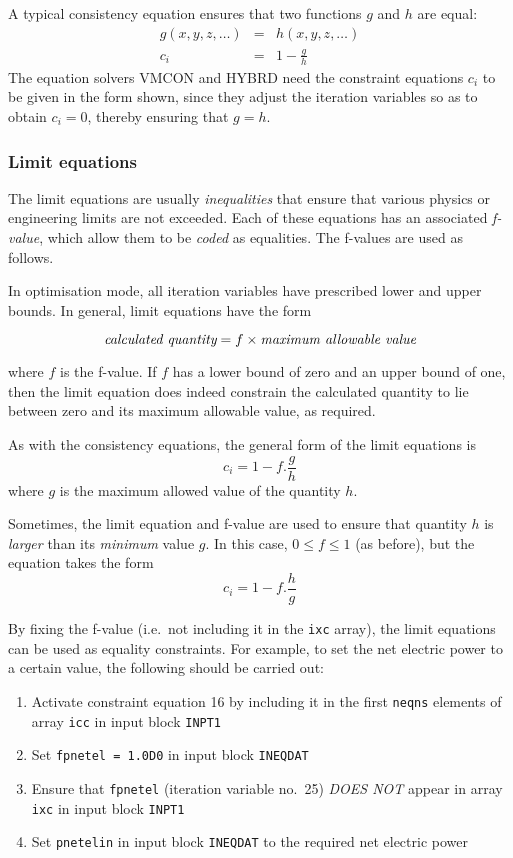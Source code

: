 \documentclass[11pt,a4paper]{report}
\begin{document}
A typical consistency equation ensures that two functions $g$ and $h$ are
equal:
\begin{eqnarray*}
g(x,y,z,\ldots) & = & h(x,y,z,\ldots) \\
c_i & = & 1 - \frac{g}{h}
\end{eqnarray*}
The equation solvers VMCON and HYBRD need the constraint equations $c_i$ to be
given in the form shown, since they adjust the iteration variables so as to
obtain $c_i = 0$, thereby ensuring that $g = h$.

\subsubsection{Limit equations}

The limit equations are usually {\em inequalities}\/ that ensure that various
physics or engineering limits are not exceeded. Each of these equations has an
associated {\em f-value}, which allow them to be {\em coded}\/ as
equalities. The f-values are used as follows.

In optimisation mode, all iteration variables have prescribed lower and upper
bounds. In general, limit equations have the form

\[ \mbox{\it calculated quantity} = f \times \mbox{\it maximum allowable
value} \]

where $f$ is the f-value. If $f$ has a lower bound of zero and an upper bound
of one, then the limit equation does indeed constrain the calculated quantity
to lie between zero and its maximum allowable value, as required.

As with the consistency equations, the general form of the limit equations is
\[ c_i = 1 - f.\frac{g}{h} \]
where $g$ is the maximum allowed value of the quantity $h$.

Sometimes, the limit equation and f-value are used to ensure that quantity $h$
is {\em larger}\/ than its {\em minimum}\/ value $g$. In this case, $0 \leq f
\leq 1$ (as before), but the equation takes the form
\[ c_i = 1 - f.\frac{h}{g} \]

By fixing the f-value (i.e.\ not including it in the {\tt ixc} array), the
limit equations can be used as equality constraints. For example, to set the
net electric power to a certain value, the following should be carried out:
\begin{enumerate}
\item
Activate constraint equation 16 by including it in the first {\tt neqns}
elements of array {\tt icc} in input block {\tt INPT1}
\item
Set {\tt fpnetel = 1.0D0} in input block {\tt INEQDAT}
\item
Ensure that {\tt fpnetel} (iteration variable no.\ 25) {\em DOES NOT}\/ appear
in array {\tt ixc} in input block {\tt INPT1}
\item
Set {\tt pnetelin} in input block {\tt INEQDAT} to the required net electric
power
\end{enumerate}
\end{document}
